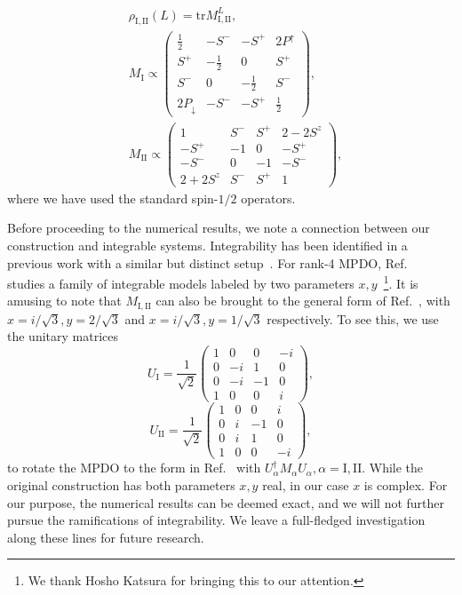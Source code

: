 \documentclass[twocolumn,aps,prb,english]{revtex4-2}
\newcommand{\tr}{\mathrm{tr}}
\newcommand{\dg}{\dagger}
\begin{document}
\begin{equation}
\begin{split}
&\rho_\mathrm{I,II}(L)=\tr M_\mathrm{I,II}^L, \\
&M_\mathrm{I}\propto\begin{pmatrix}
\frac{1}{2} & -S^- & -S^+ & 2P^\uparrow\\
S^+ & -\frac{1}{2} & 0 & S^+\\
S^- & 0 & -\frac{1}{2} & S^-\\
2P_\downarrow & -S^- & -S^+ & \frac{1}{2}
\end{pmatrix},\\
&M_\mathrm{II}\propto\begin{pmatrix}
1 & S^- & S^+ & 2-2S^z\\
-S^+ & -1 & 0 & -S^+\\
-S^- & 0 & -1 & -S^-\\
2+2S^z & S^- & S^+ & 1
\end{pmatrix},
\end{split}
\end{equation}
where we have used the standard spin-$1/2$ operators.

Before proceeding to the numerical results, we note a connection between our construction and integrable systems. Integrability has been identified in a previous work with a similar but distinct setup~\cite{Santos2015}. For rank-4 MPDO, Ref.~\cite{Katsura2015} studies a family of integrable models labeled by two parameters $x,y$~\footnote{We thank Hosho Katsura for bringing this to our attention.}. It is amusing to note that $M_\mathrm{I,II}$ can also be brought to the general form of Ref.~\cite{Katsura2015}, with $x=i/\sqrt{3},y=2/\sqrt{3}$ and $x=i/\sqrt{3},y=1/\sqrt{3}$ respectively. 
To see this, we use the unitary matrices 
\begin{equation}
U_\mathrm{I}=\frac{1}{\sqrt{2}}
\begin{pmatrix}
1 & 0 & 0 & -i\\
0 & -i & 1 & 0\\
0 & -i & -1 & 0\\
1 & 0 & 0 & i
\end{pmatrix},
\end{equation}
\begin{equation}
U_\mathrm{II}=\frac{1}{\sqrt{2}}
\begin{pmatrix}
1 & 0 & 0 & i\\
0 & i & -1 & 0\\
0 & i & 1 & 0\\
1 & 0 & 0 & -i
\end{pmatrix},
\end{equation}
to rotate the MPDO to the form in Ref.~\cite{Katsura2015} with $U_\alpha^\dg M_\alpha U_\alpha,\alpha=\mathrm{I,II}$.
While the original construction has both parameters $x,y$ real, in our case $x$ is complex. For our purpose, the numerical results can be deemed exact, and we will not further pursue the ramifications of integrability. We leave a full-fledged investigation along these lines for future research.
\end{document}

